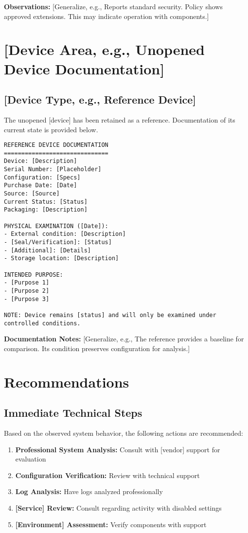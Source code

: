 \documentclass[11pt, a4paper]{article}
\begin{document}
\textbf{Observations:} [Generalize, e.g., Reports standard security. Policy shows approved extensions. This may indicate operation with components.]

\section{[Device Area, e.g., Unopened Device Documentation]}

\subsection{[Device Type, e.g., Reference Device]}
The unopened [device] has been retained as a reference. Documentation of its current state is provided below.

\begin{lstlisting}[language=text, caption={Reference Device Documentation}, label={lst:reference_device}]
REFERENCE DEVICE DOCUMENTATION
==============================
Device: [Description]
Serial Number: [Placeholder]
Configuration: [Specs]
Purchase Date: [Date]
Source: [Source]
Current Status: [Status]
Packaging: [Description]

PHYSICAL EXAMINATION ([Date]):
- External condition: [Description]
- [Seal/Verification]: [Status]
- [Additional]: [Details]
- Storage location: [Description]

INTENDED PURPOSE:
- [Purpose 1]
- [Purpose 2]
- [Purpose 3]

NOTE: Device remains [status] and will only be examined under controlled conditions.
\end{lstlisting}

\textbf{Documentation Notes:} [Generalize, e.g., The reference provides a baseline for comparison. Its condition preserves configuration for analysis.]

\section{Recommendations}

\subsection{Immediate Technical Steps}
Based on the observed system behavior, the following actions are recommended:

\begin{enumerate}
    \item \textbf{Professional System Analysis:} Consult with [vendor] support for evaluation
    \item \textbf{Configuration Verification:} Review with technical support
    \item \textbf{Log Analysis:} Have logs analyzed professionally
    \item \textbf{[Service] Review:} Consult regarding activity with disabled settings
    \item \textbf{[Environment] Assessment:} Verify components with support
\end{enumerate}
\end{document}
